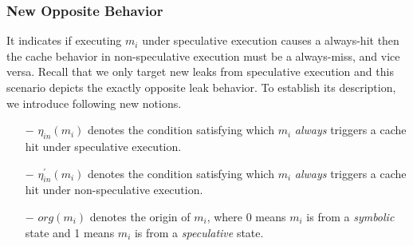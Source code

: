 \documentclass[sigconf, review]{acmart}
\begin{document}
\subsubsection{New Opposite Behavior}
\label{sec:new_opp}
It indicates if executing $\mathit{m_i}$ under speculative execution causes 
a always-hit then the cache behavior in non-speculative execution must be a 
always-miss, and vice versa. Recall that we only target new leaks from 
speculative execution and this scenario depicts the exactly opposite leak
behavior. To establish its description, we introduce following new notions. 

%
\begin{itemize}
  \item [$-$]$\mathit{\eta_{in}(m_i)}$ denotes the condition satisfying which 
    $\mathit{m_i}$ \textit{always} triggers a cache hit under speculative 
	execution.
  \item [$-$]$\mathit{\eta^\prime_{in}(m_i)}$ denotes the condition satisfying which 
    $\mathit{m_i}$ \textit{always} triggers a cache hit under non-speculative
	execution.
  \item [$-$]$\mathit{org(m_i)}$ denotes the origin of $\mathit{m_i}$, where 0
    means $\mathit{m_i}$ is from a \textit{symbolic} state and 1 means 
    $\mathit{m_i}$ is from a \textit{speculative} state.
\end{itemize}
%
\end{document}
